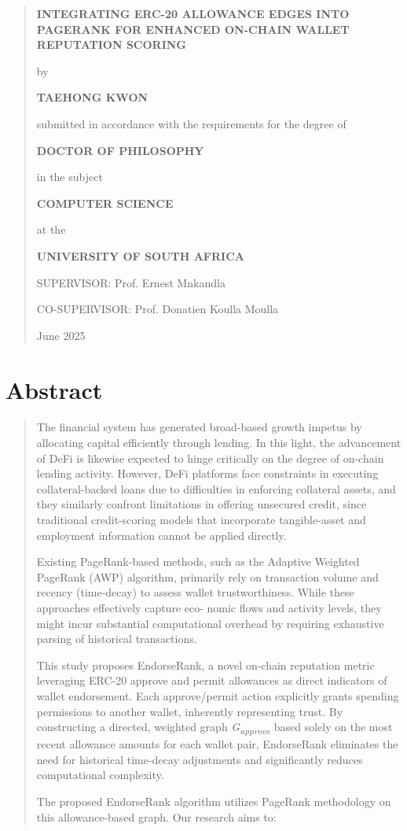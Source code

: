 \documentclass[
]{article}
\author{}
\date{}
\begin{document}
\begin{quote}
\textbf{INTEGRATING ERC-20 ALLOWANCE EDGES INTO PAGERANK FOR ENHANCED ON-CHAIN WALLET REPUTATION SCORING}

by

\textbf{TAEHONG KWON}

submitted in accordance with the requirements for the degree of

\textbf{DOCTOR OF PHILOSOPHY}

in the subject

\textbf{COMPUTER SCIENCE}

at the

\textbf{UNIVERSITY OF SOUTH AFRICA}

SUPERVISOR: Prof. Ernest Mnkandla

CO-SUPERVISOR: Prof. Donatien Koulla Moulla

June 2025
\end{quote}

\section{Abstract}\label{abstract}

\begin{quote}
The financial system has generated broad-based growth impetus by allocating capital efficiently through lending. In this light, the advancement of DeFi is likewise expected to hinge critically on the degree of on-chain lending activity. However, DeFi platforms face constraints in executing collateral-backed loans due to difficulties in enforcing collateral assets, and they similarly confront limitations in offering unsecured credit, since traditional credit-scoring models that incorporate tangible-asset and employment information cannot be applied directly.

Existing PageRank-based methods, such as the Adaptive Weighted PageRank (AWP) algorithm, primarily rely on transaction volume and recency (time-decay) to assess wallet trustworthiness. While these approaches effectively capture eco- nomic flows and activity levels, they might incur substantial computational overhead by requiring exhaustive parsing of historical transactions.

This study proposes EndorseRank, a novel on-chain reputation metric leveraging ERC-20 approve and permit allowances as direct indicators of wallet endorsement. Each approve/permit action explicitly grants spending permissions to another wallet, inherently representing trust. By constructing a directed, weighted graph \emph{G\textsubscript{approve}} based solely on the most recent allowance amounts for each wallet pair, EndorseRank eliminates the need for historical time-decay adjustments and significantly reduces computational complexity.

The proposed EndorseRank algorithm utilizes PageRank methodology on this allowance-based graph. Our research aims to:
\end{quote}
\end{document}

